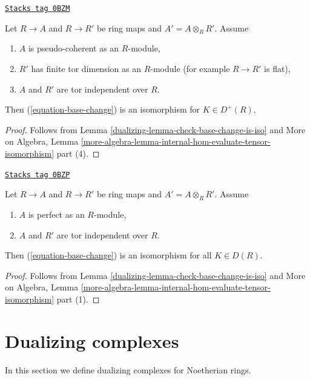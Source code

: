 \begin{lemma}
\label{dualizing-lemma-flat-bc-surjection}
\href{https://stacks.math.columbia.edu/tag/0BZM}{\texttt{Stacks tag 0BZM}}

Let $R \to A$ and $R \to R'$ be ring maps and $A' = A \otimes_R R'$.
Assume
\begin{enumerate}
\item $A$ is pseudo-coherent as an $R$-module,
\item $R'$ has finite tor dimension as an $R$-module (for example
$R \to R'$ is flat),
\item $A$ and $R'$ are tor independent over $R$.
\end{enumerate}
Then (\ref{equation-base-change}) is an isomorphism for $K \in D^+(R)$.
\end{lemma}

\begin{proof}

Follows from Lemma \ref{dualizing-lemma-check-base-change-is-iso} and
More on Algebra, Lemma
\ref{more-algebra-lemma-internal-hom-evaluate-tensor-isomorphism} part (4).
\end{proof}

\begin{lemma}[Bc surjection]
\label{dualizing-lemma-bc-surjection}
\href{https://stacks.math.columbia.edu/tag/0BZP}{\texttt{Stacks tag 0BZP}}

Let $R \to A$ and $R \to R'$ be ring maps and $A' = A \otimes_R R'$.
Assume
\begin{enumerate}
\item $A$ is perfect as an $R$-module,
\item $A$ and $R'$ are tor independent over $R$.
\end{enumerate}
Then (\ref{equation-base-change}) is an isomorphism for all $K \in D(R)$.
\end{lemma}

\begin{proof}

Follows from Lemma \ref{dualizing-lemma-check-base-change-is-iso} and
More on Algebra, Lemma
\ref{more-algebra-lemma-internal-hom-evaluate-tensor-isomorphism} part (1).
\end{proof}

\section{Dualizing complexes}
\label{dualizing-section-dualizing}
In this section we define dualizing complexes for Noetherian rings.

